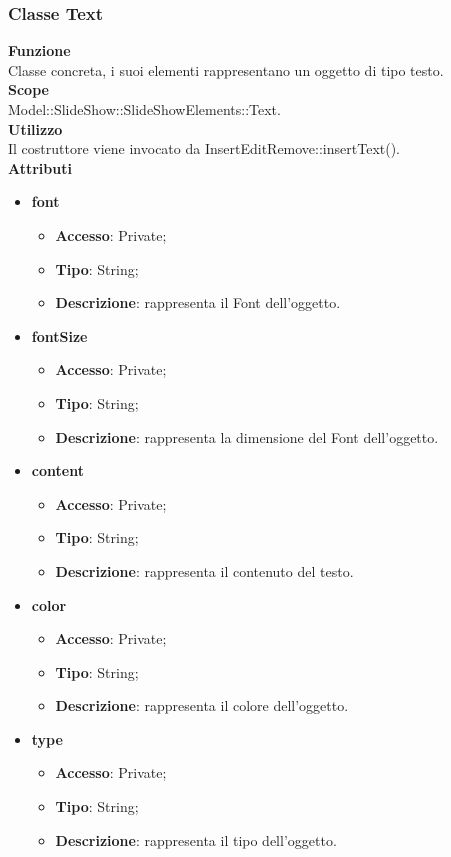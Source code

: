 {		\subsubsection{Classe Text}{
			\label{Text}
			\textbf{Funzione}\\
				\indent Classe concreta, i suoi elementi rappresentano un oggetto di tipo testo.\\
		   	\textbf{Scope}\\
				\indent Model::SlideShow::SlideShowElements::Text.\\
			\textbf{Utilizzo}\\
				\indent Il costruttore viene invocato da InsertEditRemove::insertText().\\
			\textbf{Attributi}
			\begin{itemize}
				\item \textbf{font}
				\begin{itemize}
					\item \textbf{Accesso}: Private;
					\item \textbf{Tipo}: String;
					\item \textbf{Descrizione}: rappresenta il Font dell’oggetto.
				\end{itemize}
				\item \textbf{fontSize}
				\begin{itemize}
					\item \textbf{Accesso}: Private;
					\item \textbf{Tipo}: String;
					\item \textbf{Descrizione}: rappresenta la dimensione del Font dell’oggetto.
				\end{itemize}
				\item \textbf{content}
				\begin{itemize}
					\item \textbf{Accesso}: Private;
					\item \textbf{Tipo}: String;
					\item \textbf{Descrizione}: rappresenta il contenuto del testo.
				\end{itemize}
				\item \textbf{color}
				\begin{itemize}
					\item \textbf{Accesso}: Private;
					\item \textbf{Tipo}: String;
					\item \textbf{Descrizione}: rappresenta il colore dell’oggetto.
				\end{itemize}
				\item \textbf{type}
				\begin{itemize}
					\item \textbf{Accesso}: Private;
					\item \textbf{Tipo}: String;
					\item \textbf{Descrizione}: rappresenta il tipo dell'oggetto.
				\end{itemize}
			\end{itemize}
		}
}
